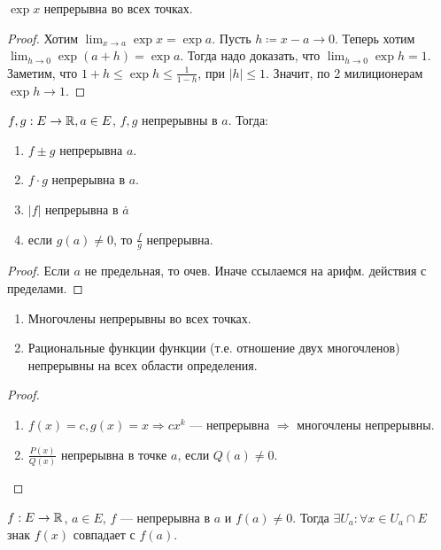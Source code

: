 \begin{theorem}
    $\exp x$ непрерывна во всех точках.
\end{theorem}
\begin{proof}
    Хотим $\lim_{x\to a} \exp x = \exp a$. Пусть  $h \coloneqq x - a \to 0$. Теперь хотим $\lim_{h \to 0} \exp(a + h) = \exp a$. Тогда надо доказать, что  $\lim_{h \to 0} \exp h = 1$. Заметим, что  $1 + h \le \exp h \le \frac{1}{1- h}$, при $|h| \le 1$. Значит, по 2 милиционерам $\exp h \to 1$.
\end{proof}
\begin{theorem}
    $f, g: E \to \mathbb{R}, a \in E$,  $f, g$ непрерывны в  $a$.
    Тогда:
     \begin{enumerate}
         \item $f \pm g$ непрерывна   $a$.
         \item  $f \cdot g$ непрерывна в  $a$.
         \item  $|f|$ непрерывна в  $a$\.
         \item если  $g(a) \neq 0$, то  $\frac{f}{g}$ непрерывна.
    \end{enumerate}
\end{theorem}
\begin{proof}
    Если $a$ не предельная, то очев. Иначе ссылаемся на арифм. действия с пределами.
\end{proof}
\begin{consequence}
    \slashn
   \begin{enumerate}
       \item Многочлены непрерывны во всех точках.
       \item Рациональные функции функции (т.е. отношение двух многочленов) непрерывны на всех области определения.
   \end{enumerate} 
\end{consequence}
\begin{proof}
    \slashn
    \begin{enumerate}
        \item $f(x) = c, g(x) = x \Rightarrow c x^k$ --- непрерывна $\Rightarrow$ многочлены непрерывны.
        \item  $\frac{P(x)}{Q(x)}$ непрерывна в точке $a$, если  $Q(a) \neq 0$.
    \end{enumerate}
\end{proof}
\begin{theorem}
    $f: E \to \mathbb{R}$,  $a \in E$,  $f$ --- непрерывна в  $a$ и  $f(a) \neq 0$. Тогда  $\exists U_a: \forall x \in U_a \cap E$ знак $f(x)$ совпадает с  $f(a)$.
\end{theorem}
